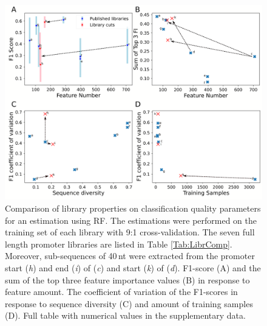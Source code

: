 \documentclass[utf8]{frontiersSCNS} %
\begin{document}
\newpage
\begin{figure}[h!]
    \begin{center}
        \includegraphics[width=.85\linewidth]{Figures/CompAnalysisLibraries.png}
    \end{center}
    \caption{Comparison of library properties on classification quality parameters for an estimation using RF. The estimations were performed on the training set of each library with 9:1 cross-validation. The seven full length promoter libraries are listed in Table \ref{Tab:LibrComp}. Moreover, sub-sequences of 40\,nt were extracted from the promoter start (\textit{h}) and end (\textit{i}) of \cite{Meng2013}(\textit{c}) and start (\textit{k}) of \cite{Zhao2020}(\textit{d}). F1-score (A) and the sum of the top three feature importance values (B) in response to feature amount. The coefficient of variation of the F1-scores in response to sequence diversity (C) and amount of training samples (D). Full table with numerical values in the supplementary data.}
    \label{Fig:CompLibraryAnal}
\end{figure}


\newpage
\end{document}
